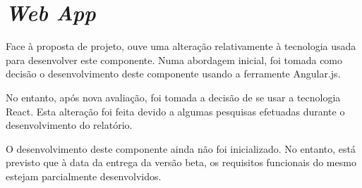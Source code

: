 \section{\textit{Web App}}
Face à proposta de projeto, ouve uma alteração relativamente à tecnologia usada para desenvolver este componente. Numa abordagem inicial, foi tomada como decisão o desenvolvimento deste componente usando a ferramente Angular.js. \par \medskip

No entanto, após nova avaliação, foi tomada a decisão de se usar a tecnologia React. Esta alteração foi feita devido a algumas pesquisas efetuadas durante o desenvolvimento do relatório. \par \medskip

O desenvolvimento deste componente ainda não foi inicializado. No entanto, está previsto que à data da entrega da versão beta, os requisitos funcionais do mesmo estejam parcialmente desenvolvidos.